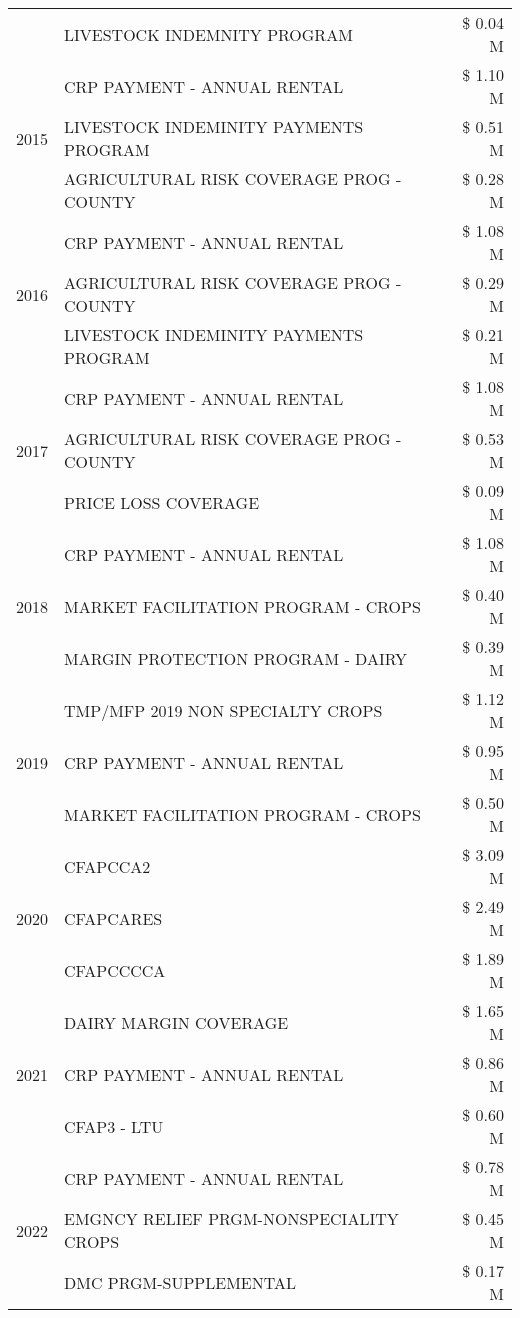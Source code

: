 \begin{tabular}{llr}
 & LIVESTOCK INDEMNITY PROGRAM & \$ 0.04 M \\
\cline{1-3}
\multirow[t]{3}{*}{2015} & CRP PAYMENT - ANNUAL RENTAL & \$ 1.10 M \\
 & LIVESTOCK INDEMINITY PAYMENTS PROGRAM & \$ 0.51 M \\
 & AGRICULTURAL RISK COVERAGE PROG - COUNTY & \$ 0.28 M \\
\cline{1-3}
\multirow[t]{3}{*}{2016} & CRP PAYMENT - ANNUAL RENTAL & \$ 1.08 M \\
 & AGRICULTURAL RISK COVERAGE PROG - COUNTY & \$ 0.29 M \\
 & LIVESTOCK INDEMINITY PAYMENTS PROGRAM & \$ 0.21 M \\
\cline{1-3}
\multirow[t]{3}{*}{2017} & CRP PAYMENT - ANNUAL RENTAL & \$ 1.08 M \\
 & AGRICULTURAL RISK COVERAGE PROG - COUNTY & \$ 0.53 M \\
 & PRICE LOSS COVERAGE & \$ 0.09 M \\
\cline{1-3}
\multirow[t]{3}{*}{2018} & CRP PAYMENT - ANNUAL RENTAL & \$ 1.08 M \\
 & MARKET FACILITATION PROGRAM - CROPS & \$ 0.40 M \\
 & MARGIN PROTECTION PROGRAM - DAIRY & \$ 0.39 M \\
\cline{1-3}
\multirow[t]{3}{*}{2019} & TMP/MFP 2019 NON SPECIALTY CROPS & \$ 1.12 M \\
 & CRP PAYMENT - ANNUAL RENTAL & \$ 0.95 M \\
 & MARKET FACILITATION PROGRAM - CROPS & \$ 0.50 M \\
\cline{1-3}
\multirow[t]{3}{*}{2020} & CFAPCCA2 & \$ 3.09 M \\
 & CFAPCARES & \$ 2.49 M \\
 & CFAPCCCCA & \$ 1.89 M \\
\cline{1-3}
\multirow[t]{3}{*}{2021} & DAIRY MARGIN COVERAGE & \$ 1.65 M \\
 & CRP PAYMENT - ANNUAL RENTAL & \$ 0.86 M \\
 & CFAP3 - LTU & \$ 0.60 M \\
\cline{1-3}
\multirow[t]{3}{*}{2022} & CRP PAYMENT - ANNUAL RENTAL & \$ 0.78 M \\
 & EMGNCY RELIEF PRGM-NONSPECIALITY CROPS & \$ 0.45 M \\
 & DMC PRGM-SUPPLEMENTAL & \$ 0.17 M \\
\cline{1-3}
\bottomrule
\end{tabular}
